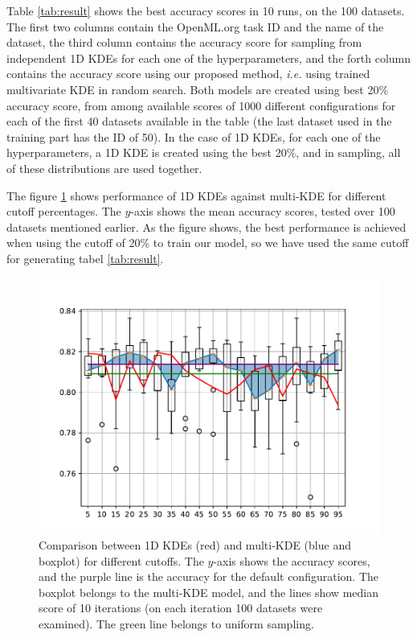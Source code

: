 \documentclass{article}
\begin{document}
Table \ref{tab:result} shows the best accuracy scores in 10 runs, on the 100 datasets. The first two columns contain the OpenML.org task ID and the name of the dataset, the third column contains the accuracy score for sampling from independent 1D KDEs for each one of the hyperparameters, and the forth column contains the accuracy score using our proposed method, \textit{i.e.} using trained multivariate KDE in random search. Both models are created using best 20\% accuracy score, from among available scores of 1000 different configurations for each of the first 40 datasets available in the table (the last dataset used in the training part has the ID of 50). In the case of 1D KDEs, for each one of the hyperparameters, a 1D KDE is created using the best 20\%, and in sampling, all of these distributions are used together.

The figure \ref{fig:cutoff} shows performance of 1D KDEs against multi-KDE for different cutoff percentages. The $y$-axis shows the mean accuracy scores, tested over 100 datasets mentioned earlier. As the figure shows, the best performance is achieved when using the cutoff of 20\% to train our model, so we have used the same cutoff for generating tabel \ref{tab:result}.

\begin{figure}
    \centering
    \includegraphics{cutoff-multi-1d-base-uni-100.pdf}
    \caption{Comparison between 1D KDEs (red) and multi-KDE (blue and boxplot) for different cutoffs. The $y$-axis shows the accuracy scores, and the purple line is the accuracy for the default configuration. The boxplot belongs to the multi-KDE model, and the lines show median score of 10 iterations (on each iteration 100 datasets were examined). The green line belongs to uniform sampling.}
    \label{fig:cutoff}
\end{figure}



\end{document}
